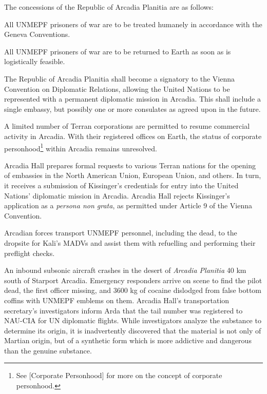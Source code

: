 The concessions of the Republic of Arcadia Planitia are as follows:
\startitemize[n]
\item All UNMEPF prisoners of war are to be treated humanely in accordance with the Geneva Conventions.
\item All UNMEPF prisoners of war are to be returned to Earth as soon as is logistically feasible.
\item The Republic of Arcadia Planitia shall become a signatory to the Vienna Convention on Diplomatic Relations, allowing the United Nations to be represented with a permanent diplomatic mission in Arcadia. This shall include a single embassy, but possibly one or more consulates as agreed upon in the future.
\item A limited number of Terran corporations are permitted to resume commercial activity in Arcadia. With their registered offices on Earth, the status of corporate personhood\footnote{See [Corporate Personhood] for more on the concept of corporate personhood.} within Arcadia remains unresolved.
\stopitemize

Arcadia Hall prepares formal requests to various Terran nations for the opening of embassies in the North American Union, European Union, and others. In turn, it receives a submission of Kissinger's credentials for entry into the United Nations' diplomatic mission in Arcadia. Arcadia Hall rejects Kissinger's application as a {\it persona non grata}, as permitted under Article 9 of the Vienna Convention.
\StopTimelineDate

Arcadian forces transport UNMEPF personnel, including the dead, to the dropsite for Kali's MADVs and assist them with refuelling and performing their preflight checks.
\StopTimelineDate

An inbound subsonic aircraft crashes in the desert of {\it Arcadia Planitia} 40 km south of Starport Arcadia. Emergency responders arrive on scene to find the pilot dead, the first officer missing, and 3600 kg of cocaine dislodged from false bottom coffins with UNMEPF emblems on them. Arcadia Hall's transportation secretary's investigators inform Arda that the tail number was registered to NAU-CIA for UN diplomatic flights. While investigators analyze the substance to determine its origin, it is inadvertently discovered that the material is not only of Martian origin, but of a synthetic form which is more addictive and dangerous than the genuine substance.
\StopTimelineDate

